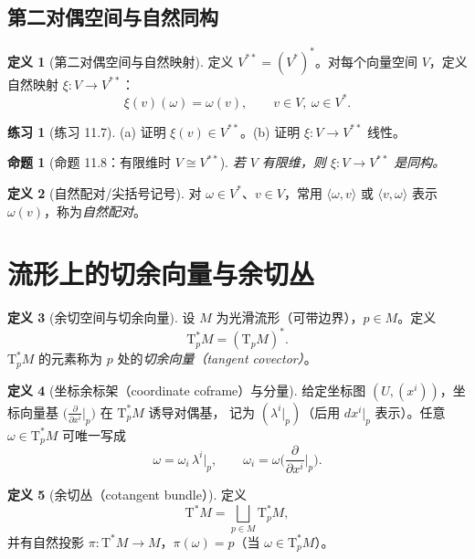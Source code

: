 \documentclass[12pt,a4paper]{article}
\theoremstyle{definition}
\newtheorem{definition}{定义}[section]
\newtheorem{exercise}{练习}[section]
\theoremstyle{plain}
\newtheorem{proposition}{命题}[section]
\newcommand{\Tp}[1]{\mathrm{T}_{#1}}
\newcommand{\Tps}[1]{\mathrm{T}^{*}_{#1}}
\newcommand{\Tstar}{\mathrm{T}^{*}}
\newcommand{\pair}[2]{\langle #1,#2\rangle}
\begin{document}
\subsection{第二对偶空间与自然同构}

\begin{definition}[第二对偶空间与自然映射]
定义 $V^{**}=(V^*)^*$。对每个向量空间 $V$，定义自然映射 $\xi:V\to V^{**}$：
\[
\xi(v)(\omega)=\omega(v),\qquad v\in V,\ \omega\in V^*.
\]
\end{definition}

\begin{exercise}[练习 11.7]
(a) 证明 $\xi(v)\in V^{**}$。\quad (b) 证明 $\xi:V\to V^{**}$ 线性。
\end{exercise}

\begin{proposition}[命题 11.8：有限维时 $V\cong V^{**}$]
若 $V$ 有限维，则 $\xi:V\to V^{**}$ 是同构。
\end{proposition}

\begin{definition}[自然配对/尖括号记号]
对 $\omega\in V^*$、$v\in V$，常用 $\pair{\omega}{v}$ 或 $\pair{v}{\omega}$ 表示 $\omega(v)$，称为\emph{自然配对}。
\end{definition}

\section{流形上的切余向量与余切丛}

\begin{definition}[余切空间与切余向量]
设 $M$ 为光滑流形（可带边界），$p\in M$。定义
\[
\Tps{p}M=(\Tp{p}M)^*.
\]
$\Tps{p}M$ 的元素称为 $p$ 处的\emph{切余向量（tangent covector）}。
\end{definition}

\begin{definition}[坐标余标架（coordinate coframe）与分量]
给定坐标图 $(U,(x^i))$，坐标向量基 $\big(\frac{\partial}{\partial x^i}\big|_p\big)$ 在 $\Tps{p}M$ 诱导对偶基，
记为 $(\lambda^i|_p)$（后用 $dx^i|_p$ 表示）。任意 $\omega\in\Tps{p}M$ 可唯一写成
\[
\omega=\omega_i\,\lambda^i|_p,\qquad \omega_i=\omega\Big(\frac{\partial}{\partial x^i}\Big|_p\Big).
\]
\end{definition}

\begin{definition}[余切丛（cotangent bundle）]
定义
\[
\Tstar M=\bigsqcup_{p\in M}\Tps{p}M,
\]
并有自然投影 $\pi:\Tstar M\to M$，$\pi(\omega)=p$（当 $\omega\in\Tps{p}M$）。
\end{definition}
\end{document}
